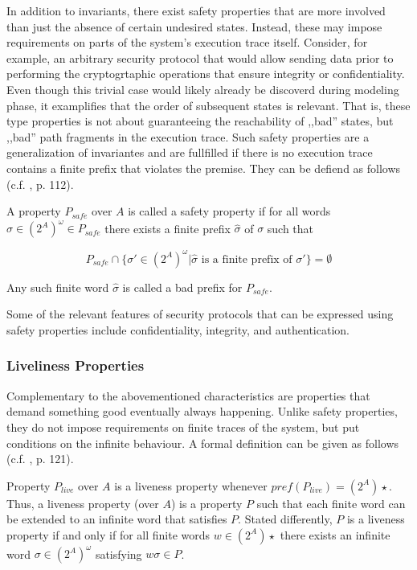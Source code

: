 In addition to invariants, there exist safety properties that are more involved than just the absence of certain undesired states.
Instead, these may impose requirements on parts of the system's execution trace itself.
Consider, for example, an arbitrary security protocol that would allow sending data prior to performing the cryptogrtaphic operations that ensure integrity or confidentiality.
Even though this trivial case would likely already be discoverd during modeling phase, it examplifies that the order of subsequent states is relevant.
That is, these type properties is not about guaranteeing the reachability of ,,bad'' states, but ,,bad'' path fragments in the execution trace.
Such safety properties are a generalization of invariantes and are fullfilled if there is no execution trace contains a finite prefix that violates the premise.
They can be defiend as follows (c.f. \cite{baier2008principles}, p. 112).

A property $P_{safe}$ over $A$ is called a safety property if for all words $\sigma \in (2^{A})^{\omega} \in P_{safe}$ there exists a finite prefix $\widehat{\sigma}$ of $\sigma$ such that

\begin{equation*}
    P_{safe} \cap \{ \sigma' \in (2^{A})^{\omega} | \widehat{\sigma} \text{ is a finite prefix of } \sigma' \} = \emptyset
\end{equation*}

\noindent
Any such finite word $\widehat{\sigma}$ is called a bad prefix for $P_{safe}$.

Some of the relevant features of security protocols that can be expressed using safety properties include confidentiality, integrity, and authentication.

\subsubsection{Liveliness Properties}

Complementary to the abovementioned characteristics are properties that demand something good eventually always happening.
Unlike safety properties, they do not impose requirements on finite traces of the system, but put conditions on the infinite behaviour.
A formal definition can be given as follows (c.f. \cite{baier2008principles}, p. 121).

Property $P_{live}$ over $A$ is a liveness property whenever $pref(P_{live}) = (2^{A})\star$.
Thus, a liveness property (over $A$) is a property $P$ such that each finite word can be extended to an infinite word that satisfies $P$.
Stated differently, $P$ is a liveness property if and only if for all finite words $w \in (2^{A})\star$ there exists an infinite word $\sigma \in (2^{A})^\omega$ satisfying $w \sigma \in P $.

